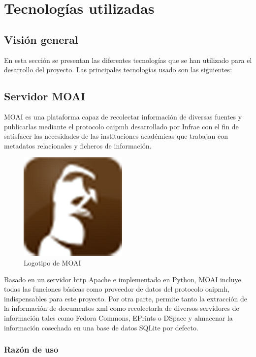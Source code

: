 \chapter{Tecnologías utilizadas}

\section{Visión general}

En esta sección se presentan las diferentes tecnologías que se han utilizado para el desarrollo del proyecto. Las principales tecnologías usado son las siguientes:

\section{Servidor MOAI}

MOAI\cite{MOAI} es una plataforma capaz de recolectar información de diversas fuentes y publicarlas mediante el protocolo \acrshort{oaipmh} desarrollado por Infrae\cite{Infrae} con el fin de satisfacer las necesidades de las instituciones académicas que trabajan con metadatos relacionales y ficheros de información.

\begin{figure}[!htbp]
	\centering
	\includegraphics{fig/moai_logo}
	\caption{Logotipo de MOAI}
\end{figure}

Basado en un servidor \acrshort{http} Apache\cite{HTTPApache} e implementado en Python, MOAI incluye todas las funciones básicas como proveedor de datos del protocolo \acrshort{oaipmh}, indispensables para este proyecto. Por otra parte, permite tanto la extracción de la información de documentos \acrshort{xml} como recolectarla de diversos servidores de información tales como Fedora Commons\cite{Fedora}, EPrints\cite{EPrints} o DSpace\cite{DSpace} y almacenar la información cosechada en una base de datos SQLite\cite{SQLite} por defecto.

\subsection{Razón de uso}

